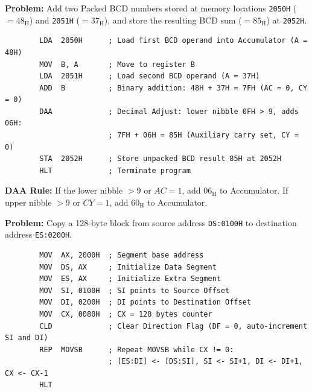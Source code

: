 \documentclass[12pt,a4paper]{article}
\begin{document}
\begin{tcolorbox}[examplebox, title={8085 BCD Addition with DAA Instruction}]
\textbf{Problem:} Add two Packed BCD numbers stored at memory locations \texttt{2050H} ($= 48_{\mathrm{H}}$) and \texttt{2051H} ($= 37_{\mathrm{H}}$), and store the resulting BCD sum ($= 85_{\mathrm{H}}$) at \texttt{2052H}.
\begin{verbatim}
        LDA  2050H      ; Load first BCD operand into Accumulator (A = 48H)
        MOV  B, A       ; Move to register B
        LDA  2051H      ; Load second BCD operand (A = 37H)
        ADD  B          ; Binary addition: 48H + 37H = 7FH (AC = 0, CY = 0)
        DAA             ; Decimal Adjust: lower nibble 0FH > 9, adds 06H:
                        ; 7FH + 06H = 85H (Auxiliary carry set, CY = 0)
        STA  2052H      ; Store unpacked BCD result 85H at 2052H
        HLT             ; Terminate program
\end{verbatim}
\textbf{DAA Rule:} If the lower nibble $> 9$ or $AC = 1$, add $06_{\mathrm{H}}$ to Accumulator. If upper nibble $> 9$ or $CY = 1$, add $60_{\mathrm{H}}$ to Accumulator.
\end{tcolorbox}

\begin{tcolorbox}[examplebox, title={8086 Block Copy Using String Primitives}]
\textbf{Problem:} Copy a 128-byte block from source address \texttt{DS:0100H} to destination address \texttt{ES:0200H}.
\begin{verbatim}
        MOV  AX, 2000H  ; Segment base address
        MOV  DS, AX     ; Initialize Data Segment
        MOV  ES, AX     ; Initialize Extra Segment
        MOV  SI, 0100H  ; SI points to Source Offset
        MOV  DI, 0200H  ; DI points to Destination Offset
        MOV  CX, 0080H  ; CX = 128 bytes counter
        CLD             ; Clear Direction Flag (DF = 0, auto-increment SI and DI)
        REP  MOVSB      ; Repeat MOVSB while CX != 0:
                        ; [ES:DI] <- [DS:SI], SI <- SI+1, DI <- DI+1, CX <- CX-1
        HLT
\end{verbatim}
\end{tcolorbox}
\end{document}
